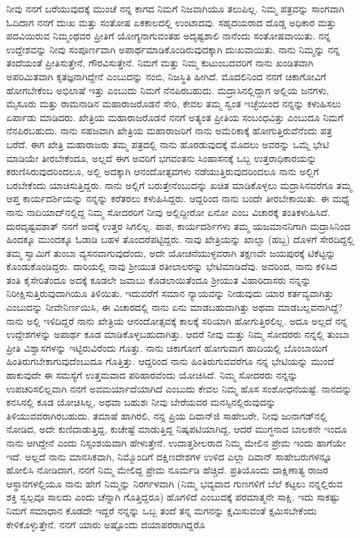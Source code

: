 ನೀವು ನನಗೆ ಬರೆಯುವುದಕ್ಕೆ ಮುಂಚೆ ನನ್ನ ಕಾಗದ ನಿಮಗೆ ನಿಜವಾಗಿಯೂ ತಲುಪಿಲ್ಲ. ನಿಮ್ಮ ಪತ್ರವನ್ನು ಸಾಂಗವಾಗಿ ಓದಿದಾಗ ನನಗೆ ದುಃಖ ಮತ್ತು ಸಂತೋಷ ಏಕಕಾಲದಲ್ಲಿ ಉಂಟಾದವು. ಸಹೃದಯರಾದ ದೊಡ್ಡ ಅಧಿಕಾರ ಮತ್ತು ಪದವಿಯಿರುವ ನಿಮ್ಮಂಥವರ ಪ್ರೀತಿಗೆ ಯೋಗ್ಯನಾಗುವಂತಹ ಅದೃಷ್ಟಶಾಲಿ ನಾನೆಂದು ಸಂತೋಷವಾಯಿತು. ನನ್ನ ಉದ್ದೇಶವನ್ನು ನೀವು ಸಂಪೂರ್ಣವಾಗಿ ಅಪಾರ್ಥಮಾಡಿಕೊಂಡಿರುವುದಕ್ಕಾಗಿ ದುಃಖವಾಯಿತು. ನಾನು ನಿಮ್ಮನ್ನು ನನ್ನ ತಂದೆಯಂತೆ ಪ್ರೀತಿಸುತ್ತೇನೆ, ಗೌರವಿಸುತ್ತೇನೆ. ನಿಮಗೆ ಮತ್ತು ನಿಮ್ಮ ಕುಟುಂಬದವರಿಗೆ ನಾನು ಖಂಡಿತವಾಗಿ ಅಪರಿಮಿತವಾಗಿ ಕೃತಜ್ಞನಾಗಿದ್ದೇನೆ ಎಂಬುದನ್ನು ನಂಬಿ, ನಿಜಸ್ಥಿತಿ ಹೀಗಿದೆ. ಮೊದಲಿನಿಂದ ನನಗೆ ಚಿಕಾಗೋವಿಗೆ ಹೋಗಬೇಕೆಂಬ ಅಭಿಲಾಷೆ ಇತ್ತು ಎಂಬುದು ನಿಮಗೆ ನೆನಪಿರಬಹುದು. ಮದ್ರಾಸಿನಲ್ಲಿದ್ದಾಗ ಅಲ್ಲಿಯ ಜನಗಳು, ಮೈಸೂರು ಮತ್ತು ರಾಮನಾಡಿನ ಮಹಾರಾಜರೊಡನೆ ಸೇರಿ, ಕೇವಲ ತಮ್ಮ ಸ್ವಂತ ಇಚ್ಛೆಯಿಂದ ನನ್ನನ್ನು ಕಳುಹಿಸಲು ಏರ್ಪಾಡು ಮಾಡಿದರು. ಖೇತ್ರಿಯ ಮಹಾರಾಜರೊಡನೆ ನನಗೆ ಅತ್ಯಂತ ಪ್ರೀತಿಯ ಸಂಬಂಧವಿತ್ತು ಎಂಬುದೂ ನಿಮಗೆ ನೆನಪಿರಬಹುದು. ನಾನು ಸಹಜವಾಗಿ ಖೇತ್ರಿಯ ಮಹಾರಾಜರಿಗೆ ನಾನು ಅಮೆರಿಕಾಕ್ಕೆ ಹೋಗುತ್ತಿರುವೆನೆಂದು ಪತ್ರ ಬರೆದೆ. ಈಗ ಖೇತ್ರಿ ಮಹಾರಾಜರು ತಮ್ಮ ಪತ್ರದಲ್ಲಿ ನಾನು ಹೊರಡುವುದಕ್ಕೆ ಮೊದಲು ಅವರನ್ನು ಒಮ್ಮೆ ಭೇಟಿ ಮಾಡಿಯೇ ತೀರಬೇಕೆಂದೂ, ಅಲ್ಲದೆ ಈಗ ಅವರಿಗೆ ಭಗವಂತನು ಸಿಂಹಾಸನಕ್ಕೆ ಒಬ್ಬ ಉತ್ತರಾಧಿಕಾರ\break ಯನ್ನು ಕರುಣಿಸಿರುವುದರಿಂದಲೂ, ಅಲ್ಲಿ ಅದಕ್ಕಾಗಿ ಆನಂದೋತ್ಸವಗಳು ನಡೆಯುತ್ತಿರುವುದರಿಂದಲೂ ನಾನು ಅಲ್ಲಿಗೆ ಬರಬೇಕೆಂದು ಯಾಚಿಸುತ್ತಿದ್ದರು. ನಾನು ಅಲ್ಲಿಗೆ ಬರುತ್ತೇ\break ನೆಂಬುದನ್ನು ಖಚಿತ ಮಾಡಿಕೊಳ್ಳಲು ಮದ್ರಾಸಿನವರೆಗೂ ತಮ್ಮ ಆಪ್ತ ಕಾರ್ಯದರ್ಶಿಯನ್ನು ನನ್ನನ್ನು ಕರೆತರಲು ಕಳುಹಿಸಿದ್ದರು. ಆದ್ದರಿಂದ ನಾನು ಬಂದೇ ತೀರಬೇಕಾಯಿತು. ಈ ಮಧ್ಯೆ ನಾನು ನಾದಿಯಾದ್‌ನಲ್ಲಿದ್ದ ನಿಮ್ಮ ಸೋದರರಿಗೆ ನೀವು ಅಲ್ಲಿದ್ದೀರೋ ಏನೋ ಎಂಬ ವಿಚಾರಕ್ಕೆ ತಂತಿಕಳುಹಿಸಿದೆ. ದುರದೃಷ್ಟವಶಾತ್ ನನಗೆ ಅದಕ್ಕೆ ಉತ್ತರ ಸಿಗಲಿಲ್ಲ. ಪಾಪ, ಕಾರ್ಯದರ್ಶಿಗಳು ತಮ್ಮ ಯಜಮಾನನಿಗಾಗಿ ಮದ್ರಾಸಿನಿಂದ ಹಿಂದಕ್ಕೂ ಮುಂದಕ್ಕೂ ಓಡಾಡಿ ಬಹಳ ತೊಂದರೆಪಟ್ಟಿದ್ದರು. ನಾವು ಖೇತ್ರಿಯನ್ನು ಖಾಲ್ಸಾ (ಹಬ್ಬ) ದೊಳಗೆ ಸೇರದಿದ್ದಲ್ಲಿ ತಮ್ಮ ಸ್ವಾಮಿಗೆ ತುಂಬಾ ವ್ಯಸನವಾಗುವುದೆಂದು, ಅದೇ ಯೋಚನೆಯುಳ್ಳವರಾಗಿ ತಕ್ಷಣವೇ ಜಯಪುರಕ್ಕೆ ಟಿಕೆಟ್ಟನ್ನು ಕೊಂಡುಕೊಂಡಿದ್ದರು. ದಾರಿಯಲ್ಲಿ ನಾವು ಶ‍್ರೀಯುತ ರತೀಲಾಲರನ್ನು ಭೇಟಿಮಾಡಿದೆವು. ಅವರಿಂದ, ನಾನು ಕಳಿಸಿದ ತಂತಿ ಕೈಸೇರಿತೆಂದೂ ಅದಕ್ಕೆ ಕೂಡಲೇ ಜವಾಬು ಕೊಡಲಾಯಿತೆಂದೂ ಶ‍್ರೀಯುತ ವಿಹಾರಿದಾಸರು ನನ್ನನ್ನು ನಿರೀಕ್ಷಿಸುತ್ತಿರುವುದಾಗಿಯೂ ತಿಳಿಯಿತು. ಇದುವರೆಗೆ ಸಮಾನ ನ್ಯಾಯವನ್ನು ನೀಡುವುದು ಯಾರ ಕರ್ತವ್ಯವಾಗಿತ್ತು ಎಂಬುದನ್ನು ನೀವೇನಿರ್ಣಯಿಸಿ, ಈ ವಿಚಾರದಲ್ಲಿ ನಾನು ಏನು ಮಾಡಬಹುದಾಗಿತ್ತು ಅಥವಾ ಮಾಡಬಲ್ಲವನಾಗಿದ್ದೆ?ನಾನು ಅಲ್ಲಿ ಇಳಿದಿದ್ದರೆ ನಾನು ಖೇತ್ರಿಯ ಆನಂದೋತ್ಸವಕ್ಕೆ ಕಾಲಕ್ಕೆ ಸರಿಯಾಗಿ ಹೋಗುತ್ತಿರಲಿಲ್ಲ. ಅದೂ ಅಲ್ಲದೆ ನನ್ನ ಉದ್ದೇಶಗಳನ್ನು ಅಪಾರ್ಥ ಕೂಡ ಮಾಡಿಕೊಳ್ಳಬಹುದಾಗಿತ್ತು. ಆದರೆ ನೀವು ಮತ್ತು ನಿಮ್ಮ ಸೋದರರು ನನ್ನಲ್ಲಿ ತುಂಬಾ ಪ್ರೀತಿ ವಿಶ್ವಾಸಗಳನ್ನು ಇಟ್ಟಿರುವಿರೆಂದು ಗೊತ್ತು. ನಾನು ಚಿಕಾಗೋಗೆ ಹೋಗುವಾಗ ಹಾದಿಯಲ್ಲಿ ಬೊಂಬಾಯಿಗೆ ಹಿಂತಿರುಗಬೇಕಾಗುವುದೆಂಬುದೂ ಗೊತ್ತಿತ್ತು. ಆದ್ದರಿಂದ ನಾನು ಹಿಂತಿರುಗುವವರೆಗೂ ನನ್ನ ಭೇಟಿಯನ್ನು ಮುಂದೆ ಹಾಕುವುದೇ ಈ ಸಮಸ್ಯೆಗೆ ಉತ್ತಮವಾದ ಪರಿಹಾರವೆಂದು ಯೋಚಿಸಿದೆ. ನಿಮ್ಮ ಸೋದರರು ನನ್ನನ್ನು ಉಪಚರಿಸಲಿಲ್ಲವಾಗಿ ನನಗೆ ಅವಮರ್ಯಾದೆಯಾಗಿದೆ ಎಂಬುದು ಕೇವಲ ನಿಮ್ಮ ಹೊಸ ಸಂಶೋಧನೆಯಷ್ಟೆ. ನಾನದನ್ನು ಕನಸಿನಲ್ಲಿ ಕೂಡ ಯೋಚಿಸಿಲ್ಲ, ಅಥವಾ ಬಹುಶಃ ನೀವು ಬೇರೆಯವರ ಮನಸ್ಸಿನಲ್ಲಿರುವುದನ್ನು ತಿಳಿಯುವವರಾಗಿರಬಹುದು. ತಮಾಷೆ ಹಾಗಿರಲಿ, ನನ್ನ ಪ್ರಿಯ ದಿವಾನ್‌ಜಿ ಸಾಹೇಬರೇ, ನೀವು ಜುನಾಗಡ್‌ನಲ್ಲಿ ನೋಡಿದ, ಅದೇ ಕುಣಿದಾಡುತ್ತಿದ್ದ, ಕುಚೇಷ್ಟೆ ಮಾಡುತ್ತಿದ್ದ ನಿಷ್ಕಪಟಿಯಾಗಿದ್ದ, ಆದರೆ ಮುಗ್ಧನಾದ ಬಾಲಕನೇ ಇಂದೂ ನಾನು ಆಗಿದ್ದೇನೆ ಎಂದು ನಿಸ್ಸಂಶಯವಾಗಿ ಹೇಳುತ್ತೇನೆ. ಉದಾತ್ತಶೀಲರಾದ ನಿಮ್ಮ ಮೇಲಿನ ಪ್ರೇಮ ಇಂದು ಹಾಗೆಯೇ ಇದೆ. ಅಲ್ಲದೆ ನಾನು ಮಾನಸಿಕವಾಗಿ, ನಿಮ್ಮೊಂದಿಗೆ ದಕ್ಷಿಣದೇಶಗಳ ಉಳಿದ ಎಲ್ಲಾ ದಿವಾನ್ ಸಾಹೇಬರುಗಳನ್ನೂ ಹೋಲಿಸಿ ನೋಡಿದಾಗ, ನನಗೆ ನಿಮ್ಮ ಮೇಲಿದ್ದ ಪ್ರೇಮ ನೂರ್ಮಡಿ ಹೆಚ್ಚಿದೆ. ಪ್ರತಿಯೊಂದು ದಾಕ್ಷಿಣಾತ್ಯ ರಾಜರ ಆಸ್ಥಾನಗಳಲ್ಲಿಯೂ ನಾನು ಹೇಗೆ ನಿಮ್ಮನ್ನು ನಿರರ್ಗಳವಾಗಿ (ನಿಮ್ಮ ಭವ್ಯವಾದ ಗುಣಗಳಿಗೆ ಬೆಲೆ ಕಟ್ಟಲು ನನ್ನಲ್ಲಿರುವ ಶಕ್ತಿ ಸ್ವಲ್ಪವೂ ಸಾಲದು ಎಂದು ಚೆನ್ನಾಗಿ ಗೊತ್ತಿದ್ದರೂ) ಹೊಗಳಿದೆ ಎಂಬುದಕ್ಕೆ ಪರಮಾತ್ಮನೇ ಸಾಕ್ಷಿ. ಇದು ಸಾಕಷ್ಟು ನಿಮಗೆ ಸಮಾಧಾನ ಕೊಡದೇ ಇದ್ದರೆ ನನ್ನನ್ನು ಒಬ್ಬ ತಂದೆ ತನ್ನ ಮಗನನ್ನು ಕ್ಷಮಿಸುವಂತೆ ಕ್ಷಮಿಸಬೇಕೆಂದು ಕೇಳಿಕೊಳ್ಳುತ್ತೇನೆ. ನನಗೆ ಯಾರು ಅಷ್ಟೊಂದು ದಯಾಪರರಾಗಿದ್ದರೊ 